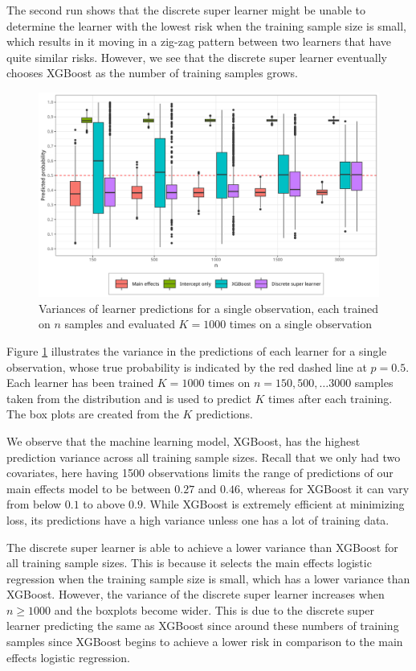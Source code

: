 \documentclass[./main.tex]{subfiles}
\begin{document}
The second run shows that the discrete super learner might be unable to determine the learner with the lowest risk when the training sample size is small, which results in it moving in a zig-zag pattern between two learners that have quite similar risks. However, we see that the discrete super learner eventually chooses XGBoost as the number of training samples grows.  

\begin{figure}[H]
    \centering
    \includegraphics[width=\textwidth]{figures/learner_vars.png}
    \caption{Variances of learner predictions for a single observation, each trained on $n$ samples and evaluated $ K = 1000 $ times on a single observation}
    \label{fig:pred_probs_boxplot}
\end{figure}
Figure \ref{fig:pred_probs_boxplot} illustrates the variance in the predictions of each learner for a single observation, whose true probability is indicated by the red dashed line at $ p = 0.5 $. Each learner has been trained $ K = 1000 $ times on $ n = 150, 500, \dots 3000 $ samples taken from the distribution and is used to predict $ K $ times after each training. The box plots are created from the $ K $ predictions. 

We observe that the machine learning model, XGBoost, has the highest prediction variance across all training sample sizes. Recall that we only had two covariates, here having 1500 observations limits the range of predictions of our main effects model to be between $ 0.27 $ and $ 0.46 $, whereas for XGBoost it can vary from below $ 0.1 $ to above $ 0.9 $. While XGBoost is extremely efficient at minimizing loss, its predictions have a high variance unless one has a lot of training data. 

The discrete super learner is able to achieve a lower variance than XGBoost for all training sample sizes. This is because it selects the main effects logistic regression when the training sample size is small, which has a lower variance than XGBoost. However, the variance of the discrete super learner increases when $ n \geq 1000 $ and the boxplots become wider. This is due to the discrete super learner predicting the same as XGBoost since around these numbers of training samples since XGBoost begins to achieve a lower risk in comparison to the main effects logistic regression. 
\end{document}
